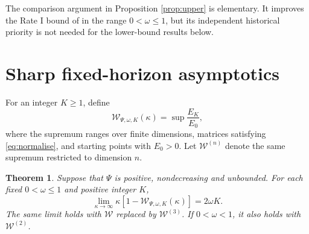 \documentclass[11pt,a4paper]{article}
\newtheorem{theorem}{Theorem}
\theoremstyle{remark}
\newcommand{\W}{\mathcal W}
\begin{document}
The comparison argument in Proposition \ref{prop:upper} is elementary. It improves the Rate I bound of \cite[Theorem 10]{MMT2025} in the range $0<\omega\le1$, but its independent historical priority is not needed for the lower-bound results below.

\section{Sharp fixed-horizon asymptotics}

For an integer $K\ge1$, define
\begin{equation}\label{eq:worstcase}
 \W_{\Psi,\omega,K}(\kappa)
 =\sup\frac{E_K}{E_0},
\end{equation}
where the supremum ranges over finite dimensions, matrices satisfying \eqref{eq:normalise}, and starting points with $E_0>0$. Let $\W^{(n)}$ denote the same supremum restricted to dimension $n$.

\begin{theorem}\label{thm:fixed}
Suppose that $\Psi$ is positive, nondecreasing and unbounded. For each fixed $0<\omega\le1$ and positive integer $K$,
\begin{equation}\label{eq:fixed}
 \lim_{\kappa\to\infty}\kappa[1-\W_{\Psi,\omega,K}(\kappa)]
 =2\omega K.
\end{equation}
The same limit holds with $\W$ replaced by $\W^{(3)}$. If $0<\omega<1$, it also holds with $\W^{(2)}$.
\end{theorem}
\end{document}
